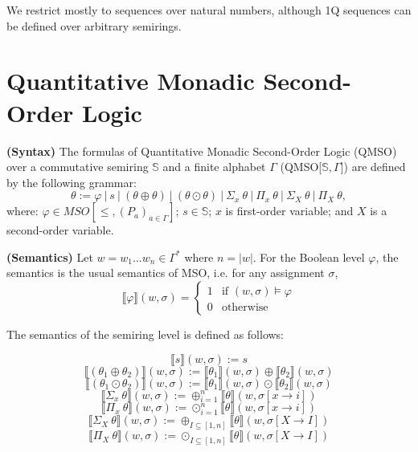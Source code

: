 \documentclass[en]{pracamgr}
\theoremstyle{definition}
\begin{document}
We restrict mostly to sequences over natural numbers, although 1Q sequences can be defined over arbitrary semirings.

\section{Quantitative Monadic Second-Order Logic}

\textbf{(Syntax)} The formulas of Quantitative Monadic Second-Order Logic (QMSO) over a commutative semiring $\mathbb{S}$ and a finite alphabet $\Gamma$ (QMSO[$\mathbb{S}, \Gamma$]) are defined by the following grammar:
$$ \theta := \varphi \ | \ s \ | \ (\theta \oplus \theta) \ | \ (\theta \odot \theta) \ | \ \Sigma_x \ \theta \ | \ \Pi_x \ \theta \ | \ \Sigma_X \ \theta \ | \ \Pi_X \ \theta,$$
where: $\varphi \in MSO[\leq, (P_a)_{a \in \Gamma}]$; $s \in \mathbb{S}$; $x$ is first-order variable; and $X$ is a second-order variable.

\textbf{(Semantics)} Let $w 
= w_1 \dots w_n \in \Gamma^*$ where $n = |w|$. For the Boolean level $\varphi$, the semantics is the usual semantics of MSO, i.e. for any assignment $\sigma$,
\begin{equation*}
    \llbracket\varphi\rrbracket(w, \sigma) =
      \begin{cases}
        1 & \text{if $(w, \sigma) \models \varphi$}\\
        0 & \text{otherwise}
      \end{cases}       
\end{equation*}

The semantics of the semiring level is defined as follows:

$$\llbracket s\rrbracket(w, \sigma) := s$$
$$\llbracket(\theta_1 \oplus \theta_2)\rrbracket(w, \sigma) := \llbracket\theta_1\rrbracket(w, \sigma) \oplus \llbracket\theta_2\rrbracket(w, \sigma)$$
$$\llbracket(\theta_1 \odot \theta_2)\rrbracket(w, \sigma) := \llbracket\theta_1\rrbracket(w, \sigma) \odot \llbracket\theta_2\rrbracket(w, \sigma)$$
$$\llbracket \Sigma_x \ \theta \rrbracket(w, \sigma) := \oplus^n_{i=1}\llbracket \theta \rrbracket (w, \sigma[x \rightarrow i])$$
$$\llbracket \Pi_x \ \theta \rrbracket(w, \sigma) := \odot^n_{i=1}\llbracket \theta \rrbracket (w, \sigma[x \rightarrow i])$$
$$\llbracket \Sigma_X \ \theta \rrbracket(w, \sigma) := \oplus_{I \subseteq [1,n]}\llbracket \theta \rrbracket (w, \sigma[X \rightarrow I])$$
$$\llbracket \Pi_X \ \theta \rrbracket(w, \sigma) := \odot_{I \subseteq [1,n]}\llbracket \theta \rrbracket (w, \sigma[X \rightarrow I])$$
\end{document}
